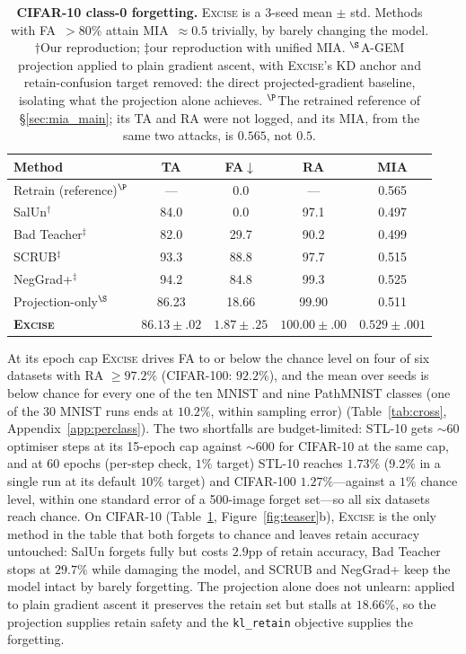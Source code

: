 \documentclass{article}
\newcommand{\ours}{\textsc{Excise}}
\newcommand{\klr}{\texttt{kl\_retain}}
\newcommand{\rev}[1]{{\color{revisedB}#1}}
\theoremstyle{remark}
\theoremstyle{plain}
\begin{document}
\begin{table}[t]
\centering
\caption{\textbf{CIFAR-10 class-0 forgetting.} \ours{} is a 3-seed mean $\pm$
std. Methods with FA~$>80\%$ attain MIA~$\approx 0.5$ trivially, by barely
changing the model. $\dagger$Our reproduction; $\ddagger$our reproduction with
unified MIA. $^\S$A-GEM projection applied to plain gradient ascent, with
\ours{}'s KD anchor and retain-confusion target removed: the direct
projected-gradient baseline, isolating what the projection alone achieves.
\rev{$^\P$The retrained reference of \S\ref{sec:mia_main}; its TA and RA were
not logged, and its MIA, from the same two attacks, is $0.565$, not $0.5$.}}
\label{tab:cifar10}
\begin{tabular}{@{}lcccc@{}}
\toprule
\textbf{Method} & \textbf{TA} & \textbf{FA}$\downarrow$ & \textbf{RA} & \textbf{MIA} \\
\midrule
\rev{Retrain (reference)$^\P$} & \rev{---} & 0.0 & \rev{---} & \rev{0.565} \\
\midrule
SalUn$^\dagger$        & 84.0 & 0.0  & 97.1 & 0.497 \\
Bad Teacher$^\ddagger$ & 82.0 & 29.7 & 90.2 & 0.499 \\
SCRUB$^\ddagger$       & 93.3 & 88.8 & 97.7 & 0.515 \\
NegGrad+$^\ddagger$    & 94.2 & 84.8 & 99.3 & 0.525 \\
\midrule
Projection-only$^\S$   & 86.23 & 18.66 & 99.90 & 0.511 \\
\midrule
\textbf{\ours{}} & $\mathbf{86.13}\pm.02$ & $\mathbf{1.87}\pm.25$ & $\mathbf{100.00}\pm.00$ & $\mathbf{0.529}\pm.001$ \\
\bottomrule
\end{tabular}
\end{table}

\rev{At its epoch cap} \ours{} drives FA to or below the chance level on four
of six datasets with RA $\ge 97.2\%$ (CIFAR-100: $92.2\%$), and \rev{the mean
over seeds is below chance for every one of the ten MNIST and nine PathMNIST
classes (one of the 30 MNIST runs ends at $10.2\%$, within sampling error)}
(Table~\ref{tab:cross}, Appendix~\ref{app:perclass}). The two shortfalls are
budget-limited: STL-10 gets ${\sim}60$ optimiser steps at \rev{its 15-epoch cap}
against ${\sim}600$ for CIFAR-10 \rev{at the same cap}, and at 60 epochs
\rev{(per-step check, $1\%$ target)} STL-10 reaches $1.73\%$ \rev{($9.2\%$ in a
single run at its default $10\%$ target)} and CIFAR-100 $1.27\%$\rev{---against a $1\%$ chance level,
within one standard error of a 500-image forget set}---so all six datasets reach
chance. On CIFAR-10 (Table~\ref{tab:cifar10}, \rev{Figure~\ref{fig:teaser}b}),
\ours{} is the only method \rev{in the table} that both forgets to chance
and leaves retain accuracy untouched: SalUn forgets fully but costs $2.9$pp of
retain accuracy, Bad Teacher stops at $29.7\%$ while damaging the model, and
SCRUB and NegGrad+ keep the model intact by barely forgetting. The projection
alone does not unlearn: applied to plain gradient ascent it preserves the retain
set but stalls at $18.66\%$, so the projection supplies retain safety and the
\klr{} objective supplies the forgetting.
\end{document}
